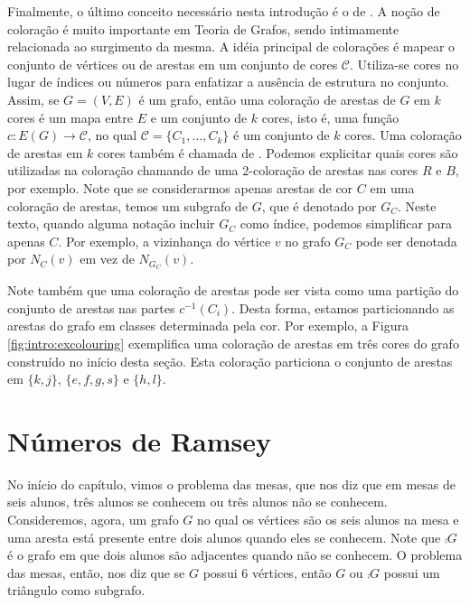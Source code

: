 Finalmente, o último conceito necessário nesta introdução é o de . A noção de coloração é muito importante em Teoria de Grafos, sendo intimamente relacionada ao surgimento da mesma. A idéia principal de colorações é mapear o conjunto de vértices ou de arestas em um conjunto de cores $\mathcal{C}$. Utiliza-se cores no lugar de índices ou números para enfatizar a ausência de estrutura no conjunto. Assim, se $G = (V,E)$ é um grafo, então uma coloração de arestas de $G$ em $k$ cores é um mapa entre $E$ e um conjunto de $k$ cores, isto é, uma função $c: E(G) \to \mathcal{C}$, no qual $\mathcal{C} = \{ C_1, \dots, C_k\}$ é um conjunto de $k$ cores.
Uma coloração de arestas em $k$ cores também é chamada de . Podemos explicitar quais cores são utilizadas na coloração chamando de  uma 2-coloração de arestas nas cores $R$ e $B$, por exemplo. Note que se considerarmos apenas arestas de cor $C$ em uma coloração de arestas, temos um subgrafo de $G$, que é denotado por $G_C$.
Neste texto, quando alguma notação incluir $G_C$ como índice, podemos simplificar para apenas $C$. Por exemplo, a vizinhança do vértice $v$ no grafo $G_C$ pode ser denotada por $N_C(v)$ em vez de $N_{G_C}(v)$.

Note também que uma coloração de arestas pode ser vista como uma partição do conjunto de arestas nas partes $c^{-1}(C_i)$. Desta forma, estamos particionando as arestas do grafo em classes determinada pela cor. Por exemplo, a Figura \ref{fig:intro:excolouring} exemplifica uma coloração de arestas em três cores do grafo construído no início desta seção. Esta coloração particiona o conjunto de arestas em $\{k,j\}$, $\{e,f,g,s\}$ e $\{h,l\}$.


\section{Números de Ramsey}

No início do capítulo, vimos o problema das mesas, que nos diz que em mesas de seis alunos, três alunos se conhecem ou três alunos não se conhecem. Consideremos, agora, um grafo $G$ no qual os vértices são os seis alunos na mesa e uma aresta está presente entre dois alunos quando eles se conhecem. Note que $\comp{G}$ é o grafo em que dois alunos são adjacentes quando não se conhecem. O problema das mesas, então, nos diz que se $G$ possui 6 vértices, então $G$ ou $\comp{G}$ possui um triângulo como subgrafo.

